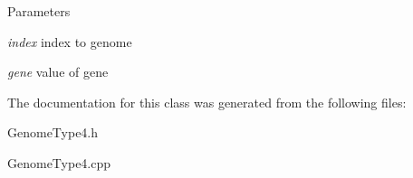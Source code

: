 \begin{DoxyParams}{Parameters}
\item[{\em index}]index to genome \item[{\em gene}]value of gene \end{DoxyParams}


The documentation for this class was generated from the following files:\begin{DoxyCompactItemize}
\item 
GenomeType4.h\item 
GenomeType4.cpp\end{DoxyCompactItemize}
